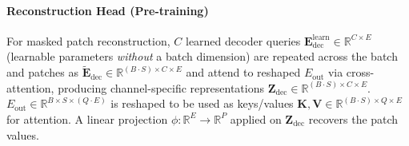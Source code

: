 \paragraph{Reconstruction Head (Pre-training)}
For masked patch reconstruction, $C$ learned decoder queries $\mathbf{E}_{\text{dec}}^{\text{learn}} \in \mathbb{R}^{C \times E}$ (learnable parameters \emph{without} a batch dimension) are repeated across the batch and patches as $\tilde{\mathbf{E}}_{\text{dec}} \in \mathbb{R}^{(B \cdot S) \times C \times E}$ and attend to reshaped $E_{\text{out}}$ via cross-attention, producing channel-specific representations $\mathbf{Z}_{\text{dec}} \in \mathbb{R}^{(B\cdot S) \times C \times E}$. $E_{\text{out}} \in \mathbb{R}^{B \times S \times (Q \cdot E)}$ is reshaped to be used as keys/values $\mathbf{K}, \mathbf{V} \in \mathbb{R}^{(B \cdot S) \times Q \times E}$ for attention. A linear projection $\phi:\mathbb{R}^{E}\!\rightarrow\!\mathbb{R}^{P}$ applied on $\mathbf{Z}_{\text{dec}}$  recovers the patch values. 
